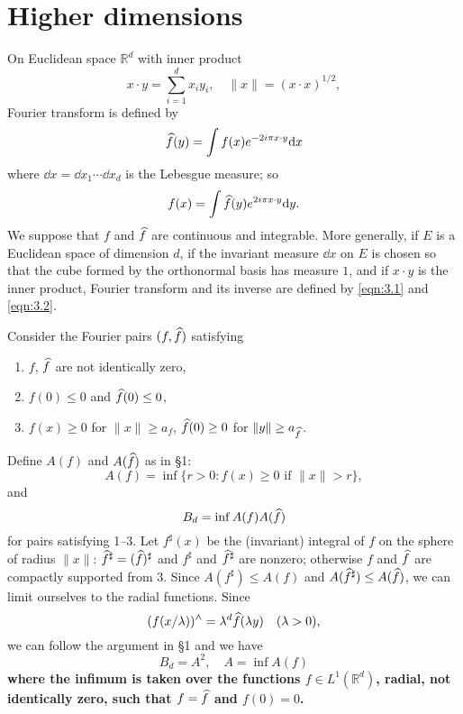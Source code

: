 \section{Higher dimensions}

On Euclidean space $\mathbb{R}^{d}$ with inner product
\[
    x \cdot y = \sum_{i=1}^{d} x_i y_i, \quad \|x\| = (x \cdot x)^{1/2},
\]
Fourier transform is defined by
\begin{equation}
    \label{eqn:3.1}
    \widehat{f}(y) = \int f(x) e^{-2 i \pi x \cdot y} \mathrm{d} x
\end{equation}
where $\dd x = \dd x_1 \cdots \dd x_d$ is the Lebesgue measure; so
\begin{equation}
    \label{eqn:3.2}
    f(x) = \int \widehat{f}(y) e^{2 i \pi x \cdot y} \mathrm{d} y.
\end{equation}
We suppose that $f$ and $\widehat{f}$ are continuous and integrable.
More generally, if $E$ is a Euclidean space of dimension $d$, if the invariant measure $\dd x$ on $E$ is chosen so that the cube formed by the orthonormal basis has measure $1$, and if $x\cdot y$ is the inner product, Fourier transform and its inverse are defined by \eqref{eqn:3.1} and \eqref{eqn:3.2}.

Consider the Fourier pairs $(f, \widehat{f})$ satisfying
\begin{enumerate}
    \item $f$, $\widehat{f}$ are not identically zero,
    \item $f(0) \leq 0$ and $\widehat{f}(0) \leq 0$, \hfill\eqnum\label{eqn:3.2}
    \item $f(x) \geq 0$ for $\|x\| \geq a_f$, $\widehat{f}(0) \geq 0$ for $\|y\| \geq a_{\widehat{f}}$.
\end{enumerate}
Define $A(f)$ and $A(\widehat{f})$ as in \S 1:
\[
    A(f) = \inf\{r > 0: f(x) \geq 0 \text{ if } \|x\| > r\},
\]
and
\[
    B_d = \inf A(f) A(\widehat{f})
\]
for pairs satisfying 1--3.
Let $f^\sharp(x)$ be the (invariant) integral of $f$ on the sphere of radius $\|x\|$: $\widehat{f}^\sharp = (\widehat{f})^{\sharp}$ and $f^\sharp$ and $\widehat{f}^{\sharp}$ are nonzero; otherwise $f$ and $\widehat{f}$ are compactly supported from 3.
Since $A(f^\sharp) \leq A(f)$ and $A(\widehat{f}^{\sharp}) \leq A(\widehat{f})$, we can limit ourselves to the radial functions.
Since
\[
    (f(x/\lambda))^\wedge = \lambda^d \widehat{f}(\lambda y)\quad (\lambda > 0),
\]
we can follow the argument in \S 1 and we have
\begin{equation}
    \label{eqn:3.4}
    B_d = A^2, \quad A = \inf A(f)
\end{equation}
\textbf{where the infimum is taken over the functions $f \in L^1(\mathbb{R}^d)$, radial, not identically zero, such that $f = \widehat{f}$ and $f(0) = 0$.}

